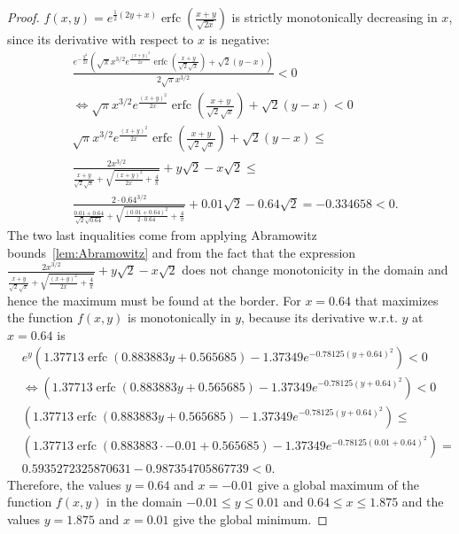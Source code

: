 \documentclass{article}
\renewcommand{\leq}{\leqslant}
\DeclareMathOperator{\erfc}{erfc}
\begin{document}
\begin{proof}
$f(x,y)=e^{\frac{1}{2} (2 y + x)} \erfc\left(\frac{x+y}{\sqrt{2 x}}\right)$ is strictly monotonically decreasing
in $x$, since its derivative with respect to $x$ is negative:
\begin{align}
 &\frac{e^{-\frac{y^2}{2 x}} \left(\sqrt{\pi } x^{3/2} e^{\frac{(x+y)^2}{2 x}} \erfc \left(\frac{x+y}{\sqrt{2} \sqrt{x}}\right)+\sqrt{2} (y-x)\right)}{2 \sqrt{\pi } x^{3/2}} < 0 \nonumber \\
 &\iff \sqrt{\pi } x^{3/2} e^{\frac{(x+y)^2}{2 x}} \erfc \left(\frac{x+y}{\sqrt{2} \sqrt{x}}\right)+\sqrt{2} (y-x) < 0  \nonumber \\
 &\sqrt{\pi } x^{3/2} e^{\frac{(x+y)^2}{2 x}} \erfc \left(\frac{x+y}{\sqrt{2} \sqrt{x}}\right)+\sqrt{2} (y-x) \leq \nonumber \\
 &\frac{2 x^{3/2}}{\frac{x+y}{\sqrt{2} \sqrt{x}}+\sqrt{\frac{(x+y)^2}{2 x}+\frac{4}{\pi }}}+ y \sqrt{2} - x \sqrt{2} \leq \nonumber \\ 
 &\frac{2\cdot 0.64^{3/2}}{\frac{0.01+0.64}{\sqrt{2} \sqrt{0.64}}+\sqrt{\frac{(0.01+0.64)^2}{2 \cdot 0.64}+\frac{4}{\pi }}}+0.01\sqrt{2}  - 0.64\sqrt{2} =  -0.334658 < 0.  
\end{align}
The two last inqualities come from applying Abramowitz bounds~\ref{lem:Abramowitz} and from the fact that the expression
$\frac{2 x^{3/2}}{\frac{x+y}{\sqrt{2} \sqrt{x}}+\sqrt{\frac{(x+y)^2}{2 x}+\frac{4}{\pi }}}+ y \sqrt{2} - x \sqrt{2}$
does not change monotonicity in the 
domain and hence the maximum must be found at the border. For $x=0.64$ that maximizes the function $f(x,y)$ is monotonically   in $y$, because 
its derivative w.r.t. $y$ at $x=0.64$ is 
\begin{align}
&e^y \left(1.37713 \erfc (0.883883 y+0.565685)-1.37349 e^{-0.78125 (y+0.64)^2}\right) < 0 \nonumber \\
&\iff  \left(1.37713 \erfc (0.883883 y+0.565685)-1.37349 e^{-0.78125 (y+0.64)^2}\right) < 0 \nonumber \\
&\left(1.37713 \erfc (0.883883 y+0.565685) - 1.37349 e^{-0.78125 (y+0.64)^2}\right) \leq \nonumber \\
&\left(1.37713 \erfc (0.883883 \cdot -0.01 + 0.565685) - 1.37349 e^{-0.78125 (0.01+0.64)^2}\right) =  \nonumber \\
&0.5935272325870631 - 0.987354705867739 < 0.
\end{align}
Therefore, the values $y=0.64$ and $x=-0.01$ give
a global maximum of the function $f(x,y)$ in the domain $-0.01\leq y \leq 0.01$ and $0.64 \leq x \leq 1.875$ and
the values $y=1.875$ and $x=0.01$ give the global minimum.
\end{proof}
\end{document}

